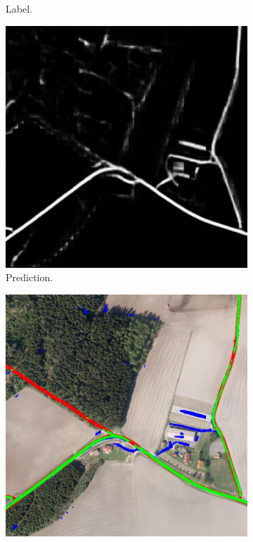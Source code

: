 \begin{figure}[H]
\begin{subfigure}{0.23\textwidth}
\caption{ Label. }
\vspace{0.2cm} %
\end{subfigure}
\hspace*{\fill} %
\begin{subfigure}{0.23\textwidth}
\includegraphics[width=\textwidth]{figs/appendix/pred1151.jpg}
\caption{ Prediction. }
\vspace{0.2cm} %
\end{subfigure}
\hspace*{\fill} %
\begin{subfigure}{0.23\textwidth}
\includegraphics[width=\textwidth]{figs/appendix/hit1151.jpg}

\end{subfigure}
\end{figure}
